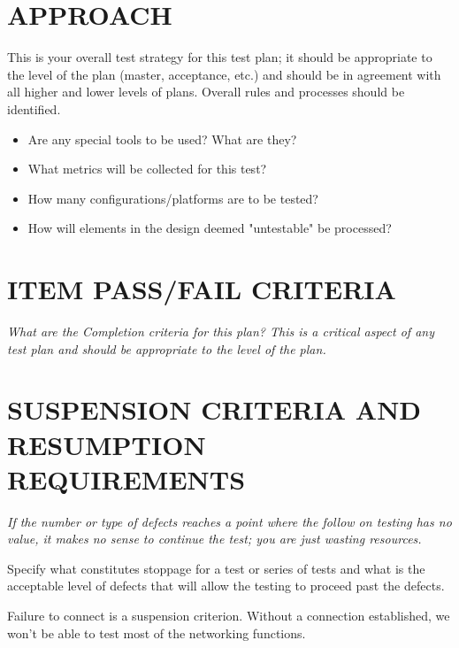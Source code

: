 \section[APPROACH]{\bfseries\color{black} APPROACH}
{\itshape\color{black}

This is your overall test strategy for this test plan; it should be
appropriate to the level of the plan (master, acceptance, etc.) and
should be in agreement with all higher and lower levels of
plans. Overall rules and processes should be identified. 

\begin{itemize}
\item Are any special tools to be used? What are they?
\item What metrics will be collected for this test?
\item How many configurations/platforms are to be tested?
\item How will elements in the design deemed "untestable" be processed?
\end{itemize}
}
{\color{black}



}

\section[ITEM PASS/FAIL CRITERIA]{\bfseries\color{black}
	 ITEM PASS/FAIL CRITERIA}
{\itshape\color{black}
What are the Completion criteria for this plan? This is a critical
aspect of any test plan and should be appropriate to the level of the plan.
}
{\color{black}

  

}

\section[SUSPENSION CRITERIA]{\bfseries\color{black}
	 SUSPENSION CRITERIA AND RESUMPTION REQUIREMENTS}
{\itshape\color{black}
If the number or type of defects reaches a point where the follow on
testing has no value, it makes no sense to continue the test; you are
just wasting resources.

Specify what constitutes stoppage for a test or series of tests and
what is the acceptable level of defects that will allow the testing to
proceed past the defects. 
}
{\color{black}

  Failure to connect is a suspension criterion. Without a connection
  established, we won't be able to test most of the networking
  functions.

}

